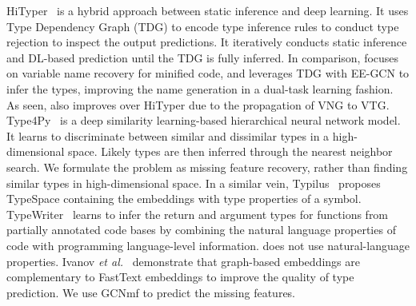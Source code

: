HiTyper~\cite{HiTyper-icse22} is a hybrid approach between static
inference and deep learning. It uses Type Dependency Graph (TDG) to
encode type inference rules to conduct type rejection to inspect the
output predictions. It iteratively conducts static inference and
DL-based prediction until the TDG is fully inferred. In comparison,
{\tool} focuses on variable name recovery for minified code, and
leverages TDG with EE-GCN to infer the types, improving the name
generation in a dual-task learning fashion. As seen, {\tool} also
improves over HiTyper due to the propagation of VNG to VTG.
%
Type4Py~\cite{Type4Py-icse22} is a deep similarity learning-based
hierarchical neural network model. It learns to discriminate between
similar and dissimilar types in a high-dimensional space. Likely types
are then inferred through the nearest neighbor search. We formulate
the problem as missing feature recovery, rather than finding similar
types in high-dimensional space. In a similar vein,
Typilus~\cite{typilus-pldi20} proposes TypeSpace containing the
embeddings with type properties of a
symbol. TypeWriter~\cite{typewriter-fse20} learns to infer the return
and argument types for functions from partially annotated code bases
by combining the natural language properties of code with programming
language-level information. {\tool} does not use natural-language
properties. Ivanov {\em et al.}~\cite{ivanov21predicting} demonstrate
that graph-based embeddings are complementary to FastText embeddings
to improve the quality of type prediction. We use GCNmf to predict
the missing features.



